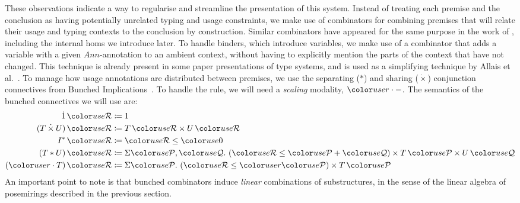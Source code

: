 These observations indicate a way to regularise and streamline the
presentation of this system. Instead of treating each premise and the
conclusion as having potentially unrelated typing and usage
constraints, we make use of combinators for combining premises that will
relate their usage and typing contexts to the conclusion by
construction.
Similar combinators have appeared for the same purpose in the work of
\citet{RPKV20}, including the internal homs we introduce later.
To handle binders, which introduce variables, we make
use of a combinator that adds a variable with a given $Ann$-annotation
to an ambient context, without having to explicitly mention the parts
of the context that have not changed. This technique is already
present in some paper presentations of type systems, and is used as a
simplifying technique by Allais et al.~\cite{AACMM20}.
To manage how usage annotations are distributed between premises, we use the
separating ($*$) and sharing ($\dot{\times}$) conjunction connectives from
Bunched Implications~\cite{oHP99}.
To handle the  rule, we will need a
\emph{scaling} modality, $\gr r \cdot {-}$. The semantics of the bunched
connectives we will use are:
  \begin{align*}
    \dot1\,\grR &\coloneqq 1 \\
    (T \dottimes U)\,\grR &\coloneqq T\,\grR \times U\,\grR \\
    I^*\,\grR &\coloneqq \grR \leq \gr0 \\
    (T \sep U)\,\grR &\coloneqq \Sigma \grP,\grQ.~\plr{\grR \leq \grP + \grQ}
                       \times T\,\grP \times U\,\grQ \\
    (\gr r \cdot T)\,\grR &\coloneqq \Sigma \grP.~\plr{\grR \leq \gr r\grP}
                       \times T\,\grP \\
  \end{align*}
An important point to note is that bunched combinators induce
\emph{linear} combinations of substructures, in the sense of the
linear algebra of posemirings described in the previous section.

